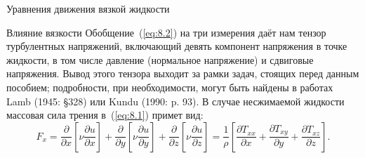 \begin{chapter}{Уравнения движения вязкой жидкости}
\begin{section}{Влияние вязкости}
Обобщение~(\ref{eq:8.2}) на три измерения даёт нам тензор турбулентных 
напряжений, включающий девять компонент напряжения в точке жидкости, 
в том числе давление (нормальное напряжение) и сдвиговые напряжения. Вывод
этого тензора выходит за рамки задач, стоящих перед данным пособием; 
подробности, при необходимости, могут быть найдены в 
работах Lamb (1945: \S 328) 
или Kundu (1990: p. 93). 
В случае несжимаемой жидкости массовая сила трения в~(\ref{eq:8.1}) примет
вид:
\begin{equation}
F_x= \frac{\partial }{\partial x} \left[ \nu \frac{\partial u}{\partial x} \right]
   + \frac{\partial }{\partial y} \left[ \nu \frac{\partial u}{\partial y} \right]
   + \frac{\partial }{\partial z} \left[ \nu \frac{\partial u}{\partial z} \right]
= \frac{1}{\rho} \left[ \frac{\partial T_{xx}}{\partial x} +
                        \frac{\partial T_{xy}}{\partial y} +
                        \frac{\partial T_{xz}}{\partial z} \right].
\end{equation}
%



\end{section}
\end{chapter}
